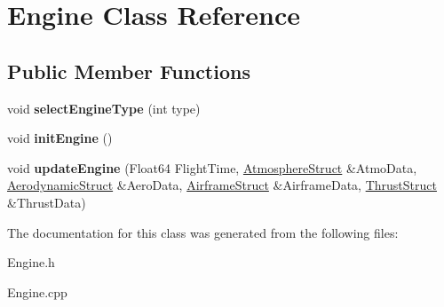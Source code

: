 \hypertarget{class_engine}{}\section{Engine Class Reference}
\label{class_engine}
\subsection*{Public Member Functions}
\begin{DoxyCompactItemize}
\item 
\mbox{\label{class_engine_ac33371d6fff86c0c8e14495f10046d9a}} 
void {\bfseries select\+Engine\+Type} (int type)
\item 
\mbox{\label{class_engine_aca6cc0dc7d537295123630a219142337}} 
void {\bfseries init\+Engine} ()
\item 
\mbox{\label{class_engine_a9e16100ffd33cf8ec632257795c03865}} 
void {\bfseries update\+Engine} (Float64 Flight\+Time, \hyperlink{group___data_cloud_struct_atmosphere_struct}{Atmosphere\+Struct} \&Atmo\+Data, \hyperlink{group___data_cloud_struct_aerodynamic_struct}{Aerodynamic\+Struct} \&Aero\+Data, \hyperlink{group___data_cloud_struct_airframe_struct}{Airframe\+Struct} \&Airframe\+Data, \hyperlink{group___data_cloud_struct_thrust_struct}{Thrust\+Struct} \&Thrust\+Data)
\end{DoxyCompactItemize}


The documentation for this class was generated from the following files\+:\begin{DoxyCompactItemize}
\item 
Engine.\+h\item 
Engine.\+cpp\end{DoxyCompactItemize}
